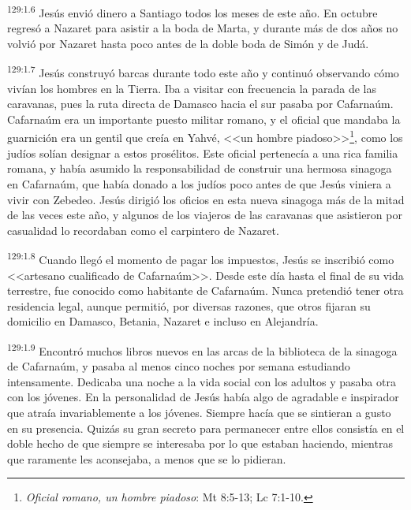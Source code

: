 \par 
\textsuperscript{129:1.6} Jesús envió dinero a Santiago todos los meses de este año. En octubre regresó a Nazaret para asistir a la boda de Marta, y durante más de dos años no volvió por Nazaret hasta poco antes de la doble boda de Simón y de Judá.

\par 
\textsuperscript{129:1.7} Jesús construyó barcas durante todo este año y continuó observando cómo vivían los hombres en la Tierra. Iba a visitar con frecuencia la parada de las caravanas, pues la ruta directa de Damasco hacia el sur pasaba por Cafarnaúm. Cafarnaúm era un importante puesto militar romano, y el oficial que mandaba la guarnición era un gentil que creía en Yahvé, <<un hombre piadoso>>\footnote{\textit{Oficial romano, un hombre piadoso}: Mt 8:5-13; Lc 7:1-10.}, como los judíos solían designar a estos prosélitos. Este oficial pertenecía a una rica familia romana, y había asumido la responsabilidad de construir una hermosa sinagoga en Cafarnaúm, que había donado a los judíos poco antes de que Jesús viniera a vivir con Zebedeo. Jesús dirigió los oficios en esta nueva sinagoga más de la mitad de las veces este año, y algunos de los viajeros de las caravanas que asistieron por casualidad lo recordaban como el carpintero de Nazaret.

\par 
\textsuperscript{129:1.8} Cuando llegó el momento de pagar los impuestos, Jesús se inscribió como <<artesano cualificado de Cafarnaúm>>. Desde este día hasta el final de su vida terrestre, fue conocido como habitante de Cafarnaúm. Nunca pretendió tener otra residencia legal, aunque permitió, por diversas razones, que otros fijaran su domicilio en Damasco, Betania, Nazaret e incluso en Alejandría.

\par 
\textsuperscript{129:1.9} Encontró muchos libros nuevos en las arcas de la biblioteca de la sinagoga de Cafarnaúm, y pasaba al menos cinco noches por semana estudiando intensamente. Dedicaba una noche a la vida social con los adultos y pasaba otra con los jóvenes. En la personalidad de Jesús había algo de agradable e inspirador que atraía invariablemente a los jóvenes. Siempre hacía que se sintieran a gusto en su presencia. Quizás su gran secreto para permanecer entre ellos consistía en el doble hecho de que siempre se interesaba por lo que estaban haciendo, mientras que raramente les aconsejaba, a menos que se lo pidieran.

